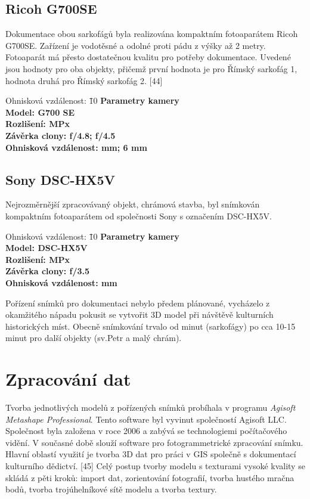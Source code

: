 \documentclass[a4paper, 12pt]{report}
\begin{document}
\subsection*{Ricoh G700SE}
Dokumentace obou sarkofágů byla realizována kompaktním fotoaparátem Ricoh G700SE. Zařízení je vodotěsné a odolné proti pádu z výšky až 2 metry.  Fotoaparát má přesto dostatečnou kvalitu pro potřeby dokumentace. Uvedené jsou hodnoty pro oba objekty, přičemž první hodnota je pro Římský sarkofág 1, hodnota druhá pro Římský sarkofág 2. [44]

\begin{tabbing}
    Ohnisková vzdálenost: \=      
    \= 10 \kill
    \bfseries Parametry kamery \> \\[1mm]
    Model:	\>	G700 SE\\
    Rozlišení:	 MPx\\
    Závěrka clony:	\>	f/4.8; f/4.5\\
    Ohnisková vzdálenost:	 mm; 6 mm\\
\end{tabbing}

\subsection*{Sony DSC-HX5V}
Nejrozměrnější zpracovávaný objekt, chrámová stavba, byl snímkován kompaktním fotoaparátem od společnosti Sony s označením DSC-HX5V.

\begin{tabbing}
    Ohnisková vzdálenost: \=      
    \= 10 \kill
    \bfseries Parametry kamery \> \\[1mm]
    Model:	\>	DSC-HX5V\\
    Rozlišení:	 MPx\\
    Závěrka clony:	\>	f/3.5\\
    Ohnisková vzdálenost:	 mm\\
\end{tabbing}
Pořízení snímků pro dokumentaci nebylo předem plánované, vycházelo z okamžitého nápadu pokusit se vytvořit 3D model při návštěvě kulturních historických míst. Obecně snímkování trvalo od minut (sarkofágy) po cca 10-15 minut pro další objekty (sv.Petr a malý chrám).

\section{Zpracování dat}
Tvorba jednotlivých modelů z pořízených snímků probíhala v programu \textit{Agisoft Metashape Professional}. Tento software byl vyvinut společností Agisoft LLC. Společnost byla založena v roce 2006 a zabývá se technologiemi počítačového vidění. V současné době slouží software pro fotogrammetrické zpracování snímku. Hlavní oblastí využití je tvorba 3D dat pro práci v GIS společně s dokumentací kulturního dědictví. [45] Celý postup tvorby modelu s texturami vysoké kvality se skládá z pěti kroků: import dat, zorientování fotografií, tvorba hustého mračna bodů, tvorba trojúhelníkové sítě modelu a tvorba textury.
\end{document}
